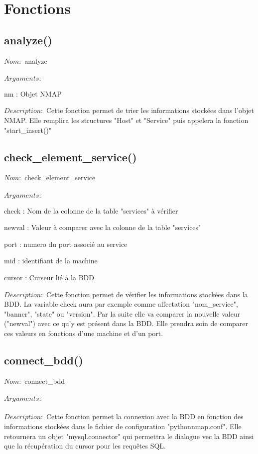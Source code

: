 \documentclass[12pt]{report}
\begin{document}
	\chapter{Fonctions}
		\section{analyze()}
			{\setlength{\parindent}{0cm}
			$Nom :$ analyze\\\\
			}
			$Arguments :$
			\begin{description}
				\item nm : Objet NMAP\\
			\end{description}
			$Description : $ Cette fonction permet de trier les informations stockées dans l'objet NMAP. Elle remplira les structures "Host" et "Service" puis appelera la fonction "start\_insert()"
		\section{check\_element\_service()}
			{\setlength{\parindent}{0cm}
			$Nom :$ check\_element\_service\\\\
			}
			$Arguments :$
			\begin{description}
				\item check : Nom de la colonne de la table "services" à vérifier
				\item newval : Valeur à comparer avec la colonne de la table "services"
				\item port : numero du port associé au service
				\item mid : identifiant de la machine
				\item cursor : Curseur lié à la BDD\\
			\end{description}
			$Description : $ Cette fonction permet de vérifier les informations stockées dans la BDD. La variable check aura par exemple comme affectation "nom\_service", "banner", "state" ou "version". Par la suite elle va comparer la nouvelle valeur ("newval") avec ce qu'y est présent dans la BDD.  Elle prendra soin de comparer ces valeurs en fonctions d'une machine et d'un port.
		\section{connect\_bdd()}
			{\setlength{\parindent}{0cm}
			$Nom :$ connect\_bdd\\\\
			}
			$Arguments :$\\\\
			$Description : $ Cette fonction permet la connexion avec la BDD en fonction des informations stockées dans le fichier de configuration "pythonnmap.conf". Elle retournera un objet "mysql.connector" qui permettra le dialogue vec la BDD ainsi que la récupération du cursor pour les requêtes SQL.
\end{document}
